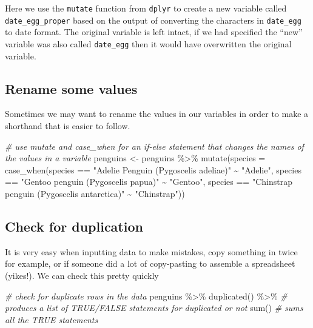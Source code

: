 \documentclass[
]{book}
\newenvironment{Shaded}{\begin{snugshade}}{\end{snugshade}}
\newcommand{\AttributeTok}[1]{\textcolor[rgb]{0.77,0.63,0.00}{#1}}
\newcommand{\CommentTok}[1]{\textcolor[rgb]{0.56,0.35,0.01}{\textit{#1}}}
\newcommand{\FunctionTok}[1]{\textcolor[rgb]{0.00,0.00,0.00}{#1}}
\newcommand{\NormalTok}[1]{#1}
\newcommand{\OtherTok}[1]{\textcolor[rgb]{0.56,0.35,0.01}{#1}}
\newcommand{\SpecialCharTok}[1]{\textcolor[rgb]{0.00,0.00,0.00}{#1}}
\newcommand{\StringTok}[1]{\textcolor[rgb]{0.31,0.60,0.02}{#1}}
\begin{document}
Here we use the \texttt{mutate} function from \texttt{dplyr} to create a new variable called \texttt{date\_egg\_proper} based on the output of converting the characters in \texttt{date\_egg} to date format. The original variable is left intact, if we had specified the ``new'' variable was also called \texttt{date\_egg} then it would have overwritten the original variable.

\hypertarget{rename-some-values}{%
\subsection{Rename some values}\label{rename-some-values}}

Sometimes we may want to rename the values in our variables in order to make a shorthand that is easier to follow.

\begin{Shaded}
\begin{Highlighting}[]
\CommentTok{\# use mutate and case\_when for an if{-}else statement that changes the names of the values in a variable}
\NormalTok{penguins }\OtherTok{\textless{}{-}}\NormalTok{ penguins }\SpecialCharTok{\%\textgreater{}\%} 
  \FunctionTok{mutate}\NormalTok{(}\AttributeTok{species =} \FunctionTok{case\_when}\NormalTok{(species }\SpecialCharTok{==} \StringTok{"Adelie Penguin (Pygoscelis adeliae)"} \SpecialCharTok{\textasciitilde{}} \StringTok{"Adelie"}\NormalTok{,}
\NormalTok{                             species }\SpecialCharTok{==} \StringTok{"Gentoo penguin (Pygoscelis papua)"} \SpecialCharTok{\textasciitilde{}} \StringTok{"Gentoo"}\NormalTok{,}
\NormalTok{                             species }\SpecialCharTok{==} \StringTok{"Chinstrap penguin (Pygoscelis antarctica)"} \SpecialCharTok{\textasciitilde{}} \StringTok{"Chinstrap"}\NormalTok{))}
\end{Highlighting}
\end{Shaded}

\hypertarget{check-for-duplication}{%
\subsection{Check for duplication}\label{check-for-duplication}}

It is very easy when inputting data to make mistakes, copy something in twice for example, or if someone did a lot of copy-pasting to assemble a spreadsheet (yikes!). We can check this pretty quickly

\begin{Shaded}
\begin{Highlighting}[]
\CommentTok{\# check for duplicate rows in the data}
\NormalTok{penguins }\SpecialCharTok{\%\textgreater{}\%} 
  \FunctionTok{duplicated}\NormalTok{() }\SpecialCharTok{\%\textgreater{}\%} \CommentTok{\# produces a list of TRUE/FALSE statements for duplicated or not}
  \FunctionTok{sum}\NormalTok{() }\CommentTok{\# sums all the TRUE statements}
\end{Highlighting}
\end{Shaded}
\end{document}
